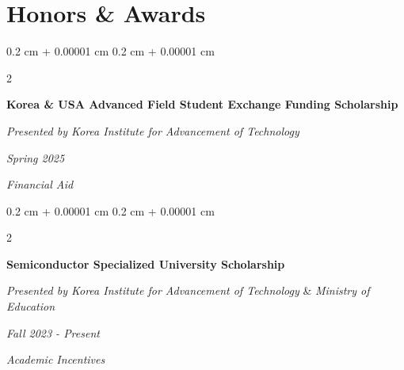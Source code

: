 \documentclass[10pt, letterpaper]{article}
\newenvironment{highlights}{
    \begin{itemize}[
        topsep=0.10 cm,
        parsep=0.10 cm,
        partopsep=0pt,
        itemsep=0pt,
        leftmargin=0.4 cm + 10pt
    ]
}{
    \end{itemize}
} %
\newenvironment{onecolentry}{
    \begin{adjustwidth}{
        0.2 cm + 0.00001 cm
    }{
        0.2 cm + 0.00001 cm
    }
}{
    \end{adjustwidth}
} %
\newenvironment{twocolentry}[2][]{
    \onecolentry
    \def\secondColumn{#2}
    \setcolumnwidth{\fill, 4.5 cm}
    \begin{paracol}{2}
}{
    \switchcolumn \raggedleft \secondColumn
    \end{paracol}
    \endonecolentry
} %
\let\hrefWithoutArrow\href
\renewcommand{\href}[2]{\hrefWithoutArrow{#1}{\ifthenelse{\equal{#2}{}}{ }{#2 }\raisebox{.15ex}{\footnotesize \faExternalLink*}}}
\begin{document}
    

            



    \section{Honors \& Awards}

        \begin{twocolentry}{
        \textit{Spring 2025}    
            
        \textit{Financial Aid}}
            \textbf{Korea \& USA Advanced Field Student Exchange Funding Scholarship}
            
            \textit{Presented by Korea Institute for Advancement of Technology}
        \end{twocolentry}
    
        \vspace{0.3 cm}

        \begin{twocolentry}{
        \textit{Fall 2023 - Present}    
            
        \textit{Academic Incentives}}
            \textbf{Semiconductor Specialized University Scholarship}
            
            \textit{Presented by Korea Institute for Advancement of Technology} \& \textit{Ministry of Education}
        \end{twocolentry}
\end{document}
